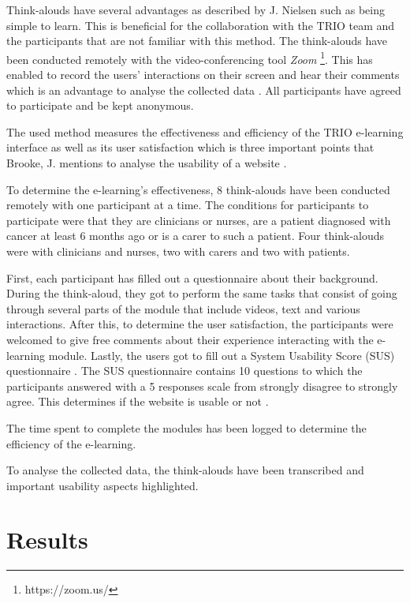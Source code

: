 \documentclass{sigchi}
\begin{document}
Think-alouds have several advantages as described by J. Nielsen \cite{nielsen2012thinking} such as being simple to learn. This is beneficial for the collaboration with the TRIO team and the participants that are not familiar with this method. The think-alouds have been conducted remotely with the video-conferencing tool \textit{Zoom} \footnote{https://zoom.us/}. This has enabled to record the users' interactions on their screen and hear their comments which is an advantage to analyse the collected data \cite{hammontree1994remote}. All participants have agreed to participate and be kept anonymous.

The used method measures the effectiveness and efficiency of the TRIO e-learning interface as well as its user satisfaction which is three important points that Brooke, J. mentions to analyse the usability of a website \cite{brooke1996sus}.

To determine the e-learning's effectiveness, 8 think-alouds have been conducted remotely with one participant at a time. The conditions for participants to participate were that they are clinicians or nurses, are a patient diagnosed with cancer at least 6 months ago or is a carer to such a patient. Four think-alouds were with clinicians and nurses, two with carers and two with patients.

First, each participant has filled out a questionnaire about their background. During the think-aloud, they got to perform the same tasks that consist of going through several parts of the module that include videos, text and various interactions. After this, to determine the user satisfaction, the participants were welcomed to give free comments about their experience interacting with the e-learning module. Lastly, the users got to fill out a System Usability Score (SUS) questionnaire \cite{brooke1996sus}. The SUS questionnaire contains 10 questions to which the participants answered with a 5 responses scale from strongly disagree to strongly agree. This determines if the website is usable or not \cite{brooke1996sus}.

The time spent to complete the modules has been logged to determine the efficiency of the e-learning. 

To analyse the collected data, the think-alouds have been transcribed and important usability aspects highlighted. 

\section{Results}
\raggedbottom
\end{document}
